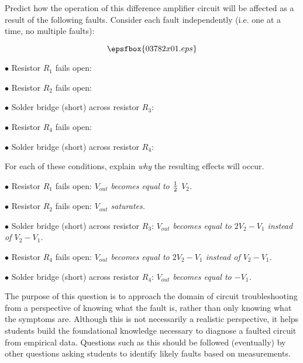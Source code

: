 

Predict how the operation of this difference amplifier circuit will be affected as a result of the following faults.  Consider each fault independently (i.e. one at a time, no multiple faults):

$$\epsfbox{03782x01.eps}$$

\medskip
\item{$\bullet$} Resistor $R_1$ fails open:
\vskip 5pt
\item{$\bullet$} Resistor $R_2$ fails open:
\vskip 5pt
\item{$\bullet$} Solder bridge (short) across resistor $R_3$:
\vskip 5pt
\item{$\bullet$} Resistor $R_4$ fails open:
\vskip 5pt
\item{$\bullet$} Solder bridge (short) across resistor $R_4$:
\medskip

For each of these conditions, explain {\it why} the resulting effects will occur.







\medskip
\item{$\bullet$} Resistor $R_1$ fails open: {\it $V_{out}$ becomes equal to ${1 \over 2}$ $V_2$.}
\vskip 5pt
\item{$\bullet$} Resistor $R_2$ fails open: {\it $V_{out}$ saturates.}
\vskip 5pt
\item{$\bullet$} Solder bridge (short) across resistor $R_3$: {\it $V_{out}$ becomes equal to $2 V_2 - V_1$ instead of $V_2 - V_1$.}
\vskip 5pt
\item{$\bullet$} Resistor $R_4$ fails open: {\it $V_{out}$ becomes equal to $2 V_2 - V_1$ instead of $V_2 - V_1$.}
\vskip 5pt
\item{$\bullet$} Solder bridge (short) across resistor $R_4$: {\it $V_{out}$ becomes equal to $-V_1$.}
\medskip







The purpose of this question is to approach the domain of circuit troubleshooting from a perspective of knowing what the fault is, rather than only knowing what the symptoms are.  Although this is not necessarily a realistic perspective, it helps students build the foundational knowledge necessary to diagnose a faulted circuit from empirical data.  Questions such as this should be followed (eventually) by other questions asking students to identify likely faults based on measurements.




